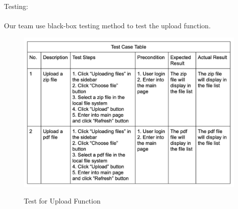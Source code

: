 \documentclass[11pt]{article}
\begin{document}
Testing:
\\
\\
Our team use black-box testing method to test the upload function.
\begin{figure}[htbp]
	\centering
	\includegraphics[width=12cm]{4.jpg}\\
	\caption{Test for Upload Function}
\end{figure}

\end{document}
